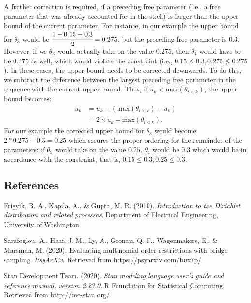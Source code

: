 \documentclass[
  english,
  man,floatsintext]{apa6}
\newlength{\cslhangindent}
\newenvironment{cslreferences}%
  {\setlength{\parindent}{0pt}%
  \everypar{\setlength{\hangindent}{\cslhangindent}}\ignorespaces}%
  {\par}
\begin{document}
\begin{appendix}
A further correction is required, if a preceding free parameter (i.e., a
free parameter that was already accounted for in the stick) is larger
than the upper bound of the current parameter. For instance, in our
example the upper bound for \(\theta_3\) would be
\(\cfrac{1 - 0.15 - 0.3}{2} = 0.275\), but the preceding free parameter
is \(0.3\). However, if we \(\theta_3\) would actually take on the value
\(0.275\), then \(\theta_4\) would have to be \(0.275\) as well, which
would violate the constraint (i.e.,
\(0.15 \leq 0.3, 0.275 \nleq 0.275\)). In these cases, the upper bound
needs to be corrected downwards. To do this, we subtract the difference
between the largest preceding free parameter in the sequence with the
current upper bound. Thus, if \(u_k < \text{max}(\theta_{i < k})\), the
upper bound becomes: \begin{align}
u_k &= u_k - (\text{max}(\theta_{i < k}) - u_k) \\
&= 2 \times u_k - \text{max}(\theta_{i < k}).
\end{align} For our example the corrected upper bound for \(\theta_3\)
would become \(2*0.275 - 0.3 = 0.25\) which secures the proper ordering
for the remainder of the parameters: if \(\theta_3\) would take on the
value \(0.25\), \(\theta_4\) would be \(0.3\) which would be in
accordance with the constraint, that is,
\(0.15 \leq 0.3, 0.25 \leq 0.3\).

\hypertarget{references}{%
\subsection{References}\label{references}}

\begingroup
\setlength{\parindent}{-0.5in}
\setlength{\leftskip}{0.5in}

\hypertarget{refs}{}
\begin{cslreferences}
\leavevmode\hypertarget{ref-frigyik2010introduction}{}%
Frigyik, B. A., Kapila, A., \& Gupta, M. R. (2010). \emph{Introduction
to the Dirichlet distribution and related processes}. Department of
Electrical Engineering, University of Washington.

\leavevmode\hypertarget{ref-sarafoglou2020evaluatingPreprint}{}%
Sarafoglou, A., Haaf, J. M., Ly, A., Gronau, Q. F., Wagenmakers, E., \&
Marsman, M. (2020). Evaluating multinomial order restrictions with
bridge sampling. \emph{PsyArXiv}. Retrieved from
\url{https://psyarxiv.com/bux7p/}

\leavevmode\hypertarget{ref-stan2020}{}%
Stan Development Team. (2020). \emph{Stan modeling language user's guide
and reference manual, version 2.23.0}. R Foundation for Statistical
Computing. Retrieved from \url{http://mc-stan.org/}
\end{cslreferences}

\endgroup
\end{appendix}
\end{document}
